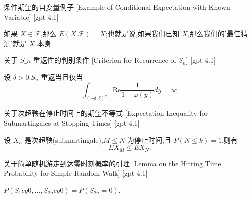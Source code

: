 \documentclass[UTF8]{ctexart}
\begin{document}
    
    
    \begin{xmp}
        {条件期望的自变量例子}
        [Example of Conditional Expectation with Known Variable]
        [gpt-4.1]
        
如果 $X \in \mathcal{F}$,那么 $E ( X | \mathcal{F} ) = X$;也就是说,如果我们已知 $X$,那么我们的'最佳猜测'就是 $X$ 本身.

    \end{xmp}
    
    
    
    \begin{thm}
        {关于 $S\_n$ 重返性的判别条件}
        [Criterion for Recurrence of $S_n$]
        [gpt-4.1]
        
设 $\delta > 0$.$S_n$ 重返当且仅当
\[
\int_{(-\delta, \delta)^d} \mathrm{Re} \frac{1}{1 - \varphi(y)} dy = \infty
\]

    \end{thm}
    
    
    
    \begin{thm}
        {关于次超鞅在停止时间上的期望不等式}
        [Expectation Inequality for Submartingales at Stopping Times]
        [gpt-4.1]
        
设 $X_n$ 是次超鞅(submartingale),$M \leq N$ 为停止时间,且 $P(N \leq k) = 1$,则有
\[
E X_M \leq E X_N.
\]

    \end{thm}
    
    
    
    \begin{lma}
        {关于简单随机游走到达零时刻概率的引理}
        [Lemma on the Hitting Time Probability for Simple Random Walk]
        [gpt-4.1]
        
$P(S_1 
eq 0, \ldots, S_{2n} 
eq 0) = P(S_{2n} = 0)$.

    \end{lma}
    
    
    
\end{document}
